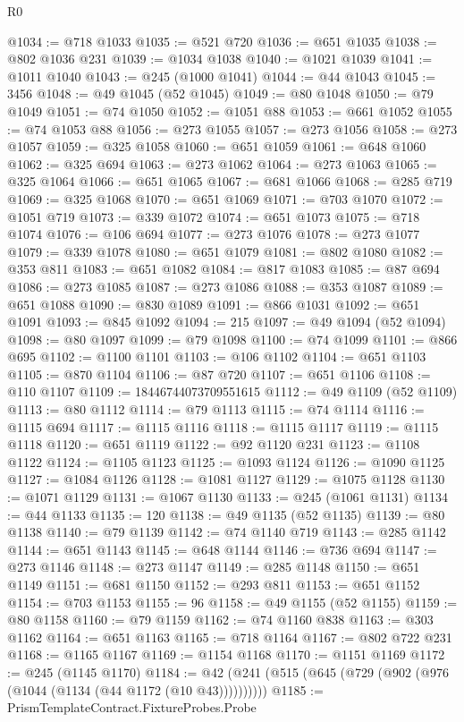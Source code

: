 \begin{lexlean}{R0}
\begin{coremodule}
@1034 := @718 @1033
@1035 := @521 @720
@1036 := @651 @1035
@1038 := @802 @1036 @231
@1039 := @1034 @1038
@1040 := @1021 @1039
@1041 := @1011 @1040
@1043 := @245 (@1000 @1041)
@1044 := @44 @1043
@1045 := 3456
@1048 := @49 @1045 (@52 @1045)
@1049 := @80 @1048
@1050 := @79 @1049
@1051 := @74 @1050
@1052 := @1051 @88
@1053 := @661 @1052
@1055 := @74 @1053 @88
@1056 := @273 @1055
@1057 := @273 @1056
@1058 := @273 @1057
@1059 := @325 @1058
@1060 := @651 @1059
@1061 := @648 @1060
@1062 := @325 @694
@1063 := @273 @1062
@1064 := @273 @1063
@1065 := @325 @1064
@1066 := @651 @1065
@1067 := @681 @1066
@1068 := @285 @719
@1069 := @325 @1068
@1070 := @651 @1069
@1071 := @703 @1070
@1072 := @1051 @719
@1073 := @339 @1072
@1074 := @651 @1073
@1075 := @718 @1074
@1076 := @106 @694
@1077 := @273 @1076
@1078 := @273 @1077
@1079 := @339 @1078
@1080 := @651 @1079
@1081 := @802 @1080
@1082 := @353 @811
@1083 := @651 @1082
@1084 := @817 @1083
@1085 := @87 @694
@1086 := @273 @1085
@1087 := @273 @1086
@1088 := @353 @1087
@1089 := @651 @1088
@1090 := @830 @1089
@1091 := @866 @1031
@1092 := @651 @1091
@1093 := @845 @1092
@1094 := 215
@1097 := @49 @1094 (@52 @1094)
@1098 := @80 @1097
@1099 := @79 @1098
@1100 := @74 @1099
@1101 := @866 @695
@1102 := @1100 @1101
@1103 := @106 @1102
@1104 := @651 @1103
@1105 := @870 @1104
@1106 := @87 @720
@1107 := @651 @1106
@1108 := @110 @1107
@1109 := 18446744073709551615
@1112 := @49 @1109 (@52 @1109)
@1113 := @80 @1112
@1114 := @79 @1113
@1115 := @74 @1114
@1116 := @1115 @694
@1117 := @1115 @1116
@1118 := @1115 @1117
@1119 := @1115 @1118
@1120 := @651 @1119
@1122 := @92 @1120 @231
@1123 := @1108 @1122
@1124 := @1105 @1123
@1125 := @1093 @1124
@1126 := @1090 @1125
@1127 := @1084 @1126
@1128 := @1081 @1127
@1129 := @1075 @1128
@1130 := @1071 @1129
@1131 := @1067 @1130
@1133 := @245 (@1061 @1131)
@1134 := @44 @1133
@1135 := 120
@1138 := @49 @1135 (@52 @1135)
@1139 := @80 @1138
@1140 := @79 @1139
@1142 := @74 @1140 @719
@1143 := @285 @1142
@1144 := @651 @1143
@1145 := @648 @1144
@1146 := @736 @694
@1147 := @273 @1146
@1148 := @273 @1147
@1149 := @285 @1148
@1150 := @651 @1149
@1151 := @681 @1150
@1152 := @293 @811
@1153 := @651 @1152
@1154 := @703 @1153
@1155 := 96
@1158 := @49 @1155 (@52 @1155)
@1159 := @80 @1158
@1160 := @79 @1159
@1162 := @74 @1160 @838
@1163 := @303 @1162
@1164 := @651 @1163
@1165 := @718 @1164
@1167 := @802 @722 @231
@1168 := @1165 @1167
@1169 := @1154 @1168
@1170 := @1151 @1169
@1172 := @245 (@1145 @1170)
@1184 := @42 (@241 (@515 (@645 (@729 (@902 (@976 (@1044 (@1134 (@44 @1172 (@10 @43))))))))))
@1185 := PrismTemplateContract.FixtureProbes.Probe

\end{coremodule}
\end{lexlean}
